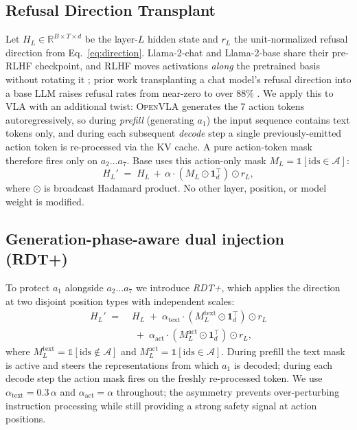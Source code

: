 \subsection{Refusal Direction Transplant}
\label{sec:method:rdt}

Let $H_L \in \mathbb{R}^{B \times T \times d}$ be the layer-$L$ hidden state and $r_L$ the unit-normalized refusal direction from Eq.~\ref{eq:direction}. Llama-2-chat and Llama-2-base share their pre-RLHF checkpoint, and RLHF moves activations \emph{along} the pretrained basis without rotating it \citep{arditi2024refusal}; prior work transplanting a chat model's refusal direction into a base LLM raises refusal rates from near-zero to over 88\% \citep{baselmsrefuse2024}. We apply this to VLA with an additional twist: \textsc{OpenVLA} generates the 7 action tokens autoregressively, so during \emph{prefill} (generating $a_1$) the input sequence contains text tokens only, and during each subsequent \emph{decode} step a single previously-emitted action token is re-processed via the KV cache. A pure action-token mask therefore fires only on $a_2 \ldots a_7$. Base \method{} uses this action-only mask $M_L = \mathbb{1}[\mathrm{ids} \in \mathcal{A}]$:
\begin{equation}
  H_L' \;=\; H_L \,+\, \alpha \cdot (M_L \odot \mathbf{1}_d^\top) \odot r_L,
  \label{eq:rdt}
\end{equation}
where $\odot$ is broadcast Hadamard product. No other layer, position, or model weight is modified.

\subsection{Generation-phase-aware dual injection (RDT+)}
\label{sec:method:dualphase}

To protect $a_1$ alongside $a_2 \ldots a_7$ we introduce \emph{RDT+}, which applies the direction at two disjoint position types with independent scales:
\begin{equation}
\begin{split}
  H_L' \;=\;& H_L
  \;+\; \alpha_{\text{text}} \cdot (M_L^{\text{text}} \odot \mathbf{1}_d^\top) \odot r_L \\
  &\;+\; \alpha_{\text{act}}  \cdot (M_L^{\text{act}}  \odot \mathbf{1}_d^\top) \odot r_L,
\end{split}
  \label{eq:rdtplus}
\end{equation}
where $M_L^{\text{text}} = \mathbb{1}[\mathrm{ids} \notin \mathcal{A}]$ and $M_L^{\text{act}} = \mathbb{1}[\mathrm{ids} \in \mathcal{A}]$. During prefill the text mask is active and steers the representations from which $a_1$ is decoded; during each decode step the action mask fires on the freshly re-processed token. We use $\alpha_{\text{text}} = 0.3\,\alpha$ and $\alpha_{\text{act}} = \alpha$ throughout; the asymmetry prevents over-perturbing instruction processing while still providing a strong safety signal at action positions.

